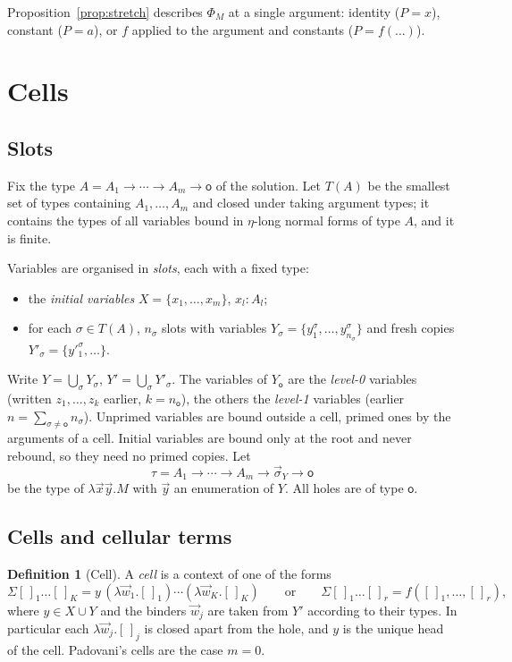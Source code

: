 \documentclass[11pt]{article}
\newcommand{\Ground}{\mathsf{o}\xspace}
\newcommand{\hole}[1]{[\,]_{#1}}
\newcommand{\mcell}{\Sigma}
\theoremstyle{definition}
\newtheorem{definition}[theorem]{Definition}
\begin{document}
Proposition~\ref{prop:stretch} describes $\Phi_M$ at a single argument:
identity ($P=x$), constant ($P=a$), or $f$ applied to the argument and
constants ($P=f(\ldots)$).

\section{Cells}\label{sec:cells}

\subsection{Slots}

Fix the type $A=A_1\to\cdots\to A_m\to\Ground$ of the solution.  Let
$T(A)$ be the smallest set of types containing $A_1,\ldots,A_m$ and
closed under taking argument types; it contains the types of all
variables bound in $\eta$-long normal forms of type $A$, and it is finite.

Variables are organised in \emph{slots}, each with a fixed type:
\begin{itemize}
\item the \emph{initial variables} $X=\{x_1,\ldots,x_m\}$, $x_l:A_l$;
\item for each $\sigma\in T(A)$, $n_\sigma$ slots with variables
  $Y_\sigma=\{y^\sigma_1,\ldots,y^\sigma_{n_\sigma}\}$ and fresh copies
  $Y'_\sigma=\{y'^\sigma_1,\ldots\}$.
\end{itemize}
Write $Y=\bigcup_\sigma Y_\sigma$, $Y'=\bigcup_\sigma Y'_\sigma$.  The
variables of $Y_\Ground$ are the \emph{level-0} variables (written
$z_1,\ldots,z_k$ earlier, $k=n_\Ground$), the others the \emph{level-1}
variables (earlier $n=\sum_{\sigma\neq\Ground}n_\sigma$).  Unprimed
variables are bound outside a cell, primed ones by the arguments of a cell.
Initial variables are bound only at the root and never rebound, so they
need no primed copies.  Let
\[
  \tau=A_1\to\cdots\to A_m\to\vec\sigma_Y\to\Ground
\]
be the type of $\lambda\vec x\vec y.M$ with $\vec y$ an enumeration of
$Y$.  All holes are of type $\Ground$.

\subsection{Cells and cellular terms}

\begin{definition}[Cell]
A \emph{cell} is a context of one of the forms
\[
\mcell\hole1\ldots\hole K=y\,(\lambda\vec w_1.\hole1)\cdots(\lambda\vec w_K.\hole K)
\qquad\text{or}\qquad
\mcell\hole1\ldots\hole r=f(\hole1,\ldots,\hole r),
\]
where $y\in X\cup Y$ and the binders $\vec w_j$ are taken from $Y'$
according to their types.  In particular each $\lambda\vec w_j.\hole j$ is
closed apart from the hole, and $y$ is the unique head of the cell.
Padovani's cells are the case $m=0$.
\end{definition}
\end{document}
